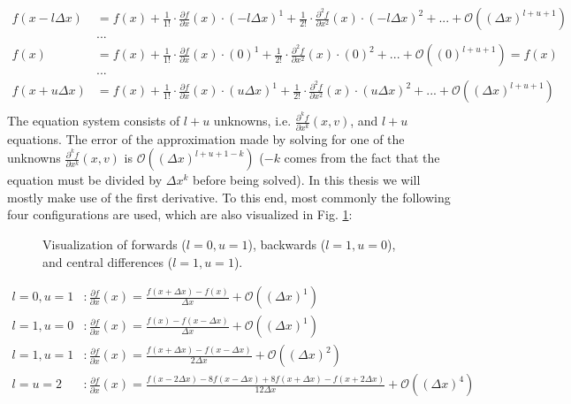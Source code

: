\begin{align*}
f(x - l \Delta x) &= f(x) + \frac{1}{1!}\cdot\frac{\partial f}{\partial x}(x)\cdot (-l\Delta x)^1 + \frac{1}{2!}\cdot\frac{\partial^2 f}{\partial x^2}(x)\cdot (-l\Delta x)^2 + ... + \mathcal{O}((\Delta x) ^{l+u+1})\\
&...\\
f(x) &= f(x) + \frac{1}{1!}\cdot\frac{\partial f}{\partial x}(x)\cdot (0)^1 + \frac{1}{2!}\cdot\frac{\partial^2 f}{\partial x^2}(x)\cdot (0)^2 + ... + \mathcal{O}((0) ^{l+u+1})= f(x)\\
&...\\
f(x + u \Delta x) &= f(x) + \frac{1}{1!}\cdot\frac{\partial f}{\partial x}(x)\cdot (u\Delta x)^1 + \frac{1}{2!}\cdot\frac{\partial^2 f}{\partial x^2}(x)\cdot (u\Delta x)^2 + ... + \mathcal{O}((\Delta x) ^{l+u+1})\\
\end{align*}
The equation system consists of $l+u$ unknowns, i.e. $\frac{\partial^k f}{\partial x^k}(x,v)$, and $l+u$ equations.
The error of the approximation made by solving for one of the unknowns $\frac{\partial^k f}{\partial x^k}(x,v)$ is $\mathcal{O}((\Delta x) ^{l+u+1-k})$ ($-k$ comes from the fact that the equation must be divided by $\Delta x ^k$ before being solved).
In this thesis we will mostly make use of the first derivative.
To this end, most commonly the following four configurations are used, which are also visualized in Fig. \ref{fig:finite_differences}:

\begin{figure}[!h]
    \caption{Visualization of forwards ($l=0,u=1$), backwards ($l=1,u=0$), and central differences ($l=1,u=1$).}
    \label{fig:finite_differences}
\end{figure}

\begin{align*}
l=0,u=1&: \frac{\partial f}{\partial x}(x) = \frac{f(x+\Delta x) - f(x)}{\Delta x} + \mathcal{O}((\Delta x)^{1})\\
l=1,u=0&: \frac{\partial f}{\partial x}(x) = \frac{f(x) - f(x-\Delta x)}{\Delta x} + \mathcal{O}((\Delta x)^{1})\\
l=1,u=1&: \frac{\partial f}{\partial x}(x) = \frac{f(x + \Delta x) - f(x-\Delta x)}{2\Delta x} + \mathcal{O}((\Delta x)^{2})\\
l=u=2&: \frac{\partial f}{\partial x}(x) = \frac{f(x-2\Delta x) -8 f(x-\Delta x) + 8 f(x+\Delta x) - f(x+2\Delta x)}{12\Delta x} + \mathcal{O}((\Delta x)^{4})\\
\end{align*}


